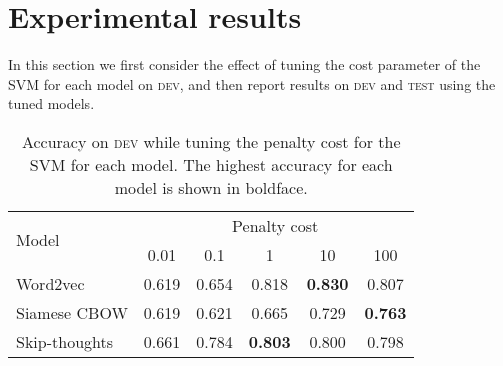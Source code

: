 \documentclass[11pt,a4paper]{article}
\newcommand{\dev}{\textsc{dev}\xspace}
\newcommand{\test}{\textsc{test}\xspace}
\begin{document}
\section{Experimental results}

In this section we first consider the effect of tuning the cost
parameter of the SVM for each model on \dev, and then report results
on \dev and \test using the tuned models.


\begin{table}
\setlength{\tabcolsep}{0.17em}
\begin{center}
\begin{tabular}{l|ccccc}
\multirow{2}{*}{Model} & \multicolumn{5}{c}{Penalty cost}\\
\cline{2-6}
 &0.01 &0.1 &1 &10 &100\\
\hline
Word2vec     &0.619 &0.654 &0.818 &\textbf{0.830} &0.807\\
Siamese CBOW &0.619 &0.621 &0.665 &0.729 & \textbf{0.763}\\
Skip-thoughts &0.661& 0.784 &\textbf{0.803} &0.800 &0.798\\
\end{tabular}
\caption{Accuracy on \dev while tuning the penalty cost for the SVM
  for each model. The highest accuracy for each model is shown in
  boldface. \label{TuningAll}}
\end{center}
\end{table}
\end{document}
